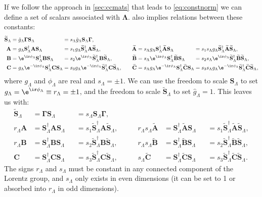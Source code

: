 \documentclass[11pt]{article}
\newcommand{\Gammab}{\boldsymbol{\Gamma}}
\renewcommand{\S}{\mathbf{S}}
\newcommand{\A}{\mathbf{A}}
\newcommand{\B}{\mathbf{B}}
\renewcommand{\C}{\mathbf{C}}
\newcommand{\At}{\widetilde{\A}}
\newcommand{\Bt}{\widetilde{\B}}
\newcommand{\Ct}{\widetilde{\C}}
\newcommand{\St}{\widetilde{\S}}
\newcommand{\Lambdab}{\boldsymbol{\Lambda}}
\begin{document}
If we follow the approach in \cref{sec:ccmats} that leads to \cref{eq:constnorm} we can define a set of scalars associated with \(\Lambdab\).
 also implies relations between these constants:
%
\begin{equation*}
\begin{alignedat}{4}
  \St_\Lambda &= \hat{g}_\Lambda \Gammab \S_\Lambda &
    &= s_\Lambda \hat{g}_\Lambda \S_\Lambda \Gammab, \\
  \A &= g_\Lambda \S_\Lambda^\dag \A \S_\Lambda &
    &= s_1 g_\Lambda \St_\Lambda^\dag \A \St_\Lambda, &\qquad
  \At &= s_\Lambda g_\Lambda \S_\Lambda^\dag \At \S_\Lambda &
    &= s_1 s_\Lambda g_\Lambda \St_\Lambda^\dag \At \St_\Lambda, \\
  \B &= \e^{\ir\phi_\Lambda} \S_\Lambda^\dag \B \S_\Lambda &
    &= s_2 \e^{\ir\phi_\Lambda} \St_\Lambda^\dag \B \St_\Lambda, &\qquad
  \Bt &= s_\Lambda \e^{\ir\phi_\Lambda} \S_\Lambda^\dag \Bt \S_\Lambda &
    &= s_2 s_\Lambda \e^{\ir\phi_\Lambda} \St_\Lambda^\dag \Bt \St_\Lambda, \\
  \C &= g_\Lambda \e^{-\ir\phi_\Lambda} \S_\Lambda^\dag \C \S_\Lambda &
    &= s_3 g_\Lambda \e^{-\ir\phi_\Lambda} \St_\Lambda^\dag \C \St_\Lambda, &\qquad
  \Ct &= s_\Lambda g_\Lambda \e^{-\ir\phi_\Lambda} \S_\Lambda^\dag \Ct \S_\Lambda &
    &= s_3 s_\Lambda g_\Lambda \e^{-\ir\phi_\Lambda} \St_\Lambda^\dag \Ct \St_\Lambda,
\end{alignedat}
\end{equation*}
%
where \(g_\Lambda\) and \(\phi_\Lambda\) are real and  \(s_\Lambda = \pm 1\).
We can use the freedom to scale \(\S_\Lambda\) to set \(g_\Lambda = \e^{\ir\phi_\Lambda} \equiv r_\Lambda = \pm 1\),
and the freedom to scale \(\St_\Lambda\) to set \(\hat{g}_\Lambda = 1\).
This leaves us with:
%
\begin{equation}\label{eq:constnormlorentz}
\begin{alignedat}{4}
  \St_\Lambda &= \Gammab \S_\Lambda &
    &= s_\Lambda \S_\Lambda \Gammab, \\
  r_\Lambda \A &= \S_\Lambda^\dag \A \S_\Lambda &
    &= s_1 \St_\Lambda^\dag \A \St_\Lambda, &\qquad
  r_\Lambda s_\Lambda \At &= \S_\Lambda^\dag \At \S_\Lambda &
    &= s_1 \St_\Lambda^\dag \At \St_\Lambda, \\
  r_\Lambda \B &= \S_\Lambda^\dag \B \S_\Lambda &
    &= s_2 \St_\Lambda^\dag \B \St_\Lambda, &\qquad
  r_\Lambda s_\Lambda \Bt &= \S_\Lambda^\dag \Bt \S_\Lambda &
    &= s_2 \St_\Lambda^\dag \Bt \St_\Lambda, \\
  \C &= \S_\Lambda^\dag \C \S_\Lambda &
    &= s_3 \St_\Lambda^\dag \C \St_\Lambda, &\qquad
  s_\Lambda \Ct &= \S_\Lambda^\dag \Ct \S_\Lambda &
    &= s_3 \St_\Lambda^\dag \Ct \St_\Lambda.
\end{alignedat}
\end{equation}
%
The signs \(r_\Lambda\) and \(s_\Lambda\) must be constant in any connected component of the Lorentz group,
and \(s_\Lambda\) only exists in even dimensions 
(it can be set to 1 or absorbed into \(r_\Lambda\) in odd dimensions).
  
\end{document}
